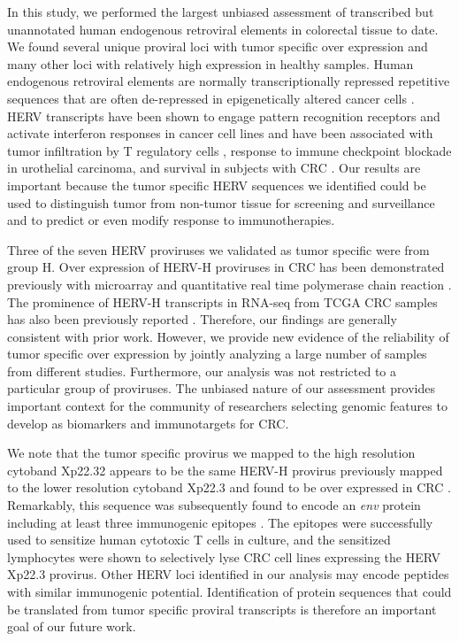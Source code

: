 In this study, we performed the largest unbiased assessment of transcribed but unannotated human endogenous retroviral elements in colorectal tissue to date.
We found several unique proviral loci with tumor specific over expression and many other loci with relatively high expression in healthy samples.
Human endogenous retroviral elements are normally transcriptionally repressed repetitive sequences that are often de-repressed in epigenetically altered cancer cells \citep{Babaian2016}.
HERV transcripts have been shown to engage pattern recognition receptors and activate interferon responses in cancer cell lines \citep{Chiappinelli2015, Roulois2015} and have been associated with tumor infiltration by T regulatory cells \citep{Desai2017}, response to immune checkpoint blockade in urothelial carcinoma, and survival in subjects with CRC \citep{Solovyov2018}.
Our results are important because the tumor specific HERV sequences we identified could be used to distinguish tumor from non-tumor tissue for screening and surveillance and to predict or even modify response to immunotherapies.

Three of the seven HERV proviruses we validated as tumor specific were from group H.
Over expression of HERV-H proviruses in CRC has been demonstrated previously with microarray \citep{Perot2012} and quantitative real time polymerase chain reaction \citep{Perot2015}.
The prominence of HERV-H transcripts in RNA-seq from TCGA CRC samples has also been previously reported \citep{Desai2017, Attig2019}.
Therefore, our findings are generally consistent with prior work.
However, we provide new evidence of the reliability of tumor specific over expression by jointly analyzing a large number of samples from different studies.
Furthermore, our analysis was not restricted to a particular group of proviruses.
The unbiased nature of our assessment provides important context for the community of researchers selecting genomic features to develop as biomarkers and immunotargets for CRC.

We note that the tumor specific provirus we mapped to the high resolution cytoband Xp22.32 appears to be the same HERV-H provirus previously mapped to the lower resolution cytoband Xp22.3 and found to be over expressed in CRC \citep{Wentzensen2007}.
Remarkably, this sequence was subsequently found to encode an \emph{env} protein including at least three immunogenic epitopes \citep{Mullins2012}.
The epitopes were successfully used to sensitize human cytotoxic T cells in culture, and the sensitized lymphocytes were shown to selectively lyse CRC cell lines expressing the HERV Xp22.3 provirus.
Other HERV loci identified in our analysis may encode peptides with similar immunogenic potential.
Identification of protein sequences that could be translated from tumor specific proviral transcripts is therefore an important goal of our future work.


